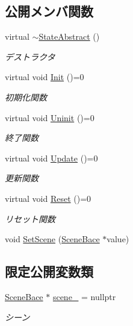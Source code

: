 \subsection*{公開メンバ関数}
\begin{DoxyCompactItemize}
\item 
virtual \mbox{\hyperlink{class_scene_bace_1_1_state_abstract_af10a26f1265f46bc2cc23c2b001dc903}{$\sim$\+State\+Abstract}} ()
\begin{DoxyCompactList}\small\item\em デストラクタ \end{DoxyCompactList}\item 
virtual void \mbox{\hyperlink{class_scene_bace_1_1_state_abstract_ae2846ccd263265142324b43bfac813ff}{Init}} ()=0
\begin{DoxyCompactList}\small\item\em 初期化関数 \end{DoxyCompactList}\item 
virtual void \mbox{\hyperlink{class_scene_bace_1_1_state_abstract_a7d5a67a3f6c1708e55a8cd39649b6813}{Uninit}} ()=0
\begin{DoxyCompactList}\small\item\em 終了関数 \end{DoxyCompactList}\item 
virtual void \mbox{\hyperlink{class_scene_bace_1_1_state_abstract_a949637cf8453ddd6a8e38fdbd6e4006e}{Update}} ()=0
\begin{DoxyCompactList}\small\item\em 更新関数 \end{DoxyCompactList}\item 
virtual void \mbox{\hyperlink{class_scene_bace_1_1_state_abstract_a006ee828975a964e513d9efb096584de}{Reset}} ()=0
\begin{DoxyCompactList}\small\item\em リセット関数 \end{DoxyCompactList}\item 
void \mbox{\hyperlink{class_scene_bace_1_1_state_abstract_ac8fb501149e60438a835315ca1151907}{Set\+Scene}} (\mbox{\hyperlink{class_scene_bace}{Scene\+Bace}} $\ast$value)
\end{DoxyCompactItemize}
\subsection*{限定公開変数類}
\begin{DoxyCompactItemize}
\item 
\mbox{\hyperlink{class_scene_bace}{Scene\+Bace}} $\ast$ \mbox{\hyperlink{class_scene_bace_1_1_state_abstract_a881f0c962327486fce549fc35549bfa8}{scene\+\_\+}} = nullptr
\begin{DoxyCompactList}\small\item\em シーン \end{DoxyCompactList}\end{DoxyCompactItemize}


